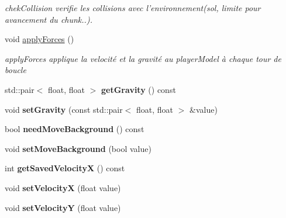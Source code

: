 \begin{DoxyCompactItemize}
\begin{DoxyCompactList}\small\item\em chek\+Collision verifie les collisions avec l'environnement(sol, limite pour avancement du chunk..). \end{DoxyCompactList}\item 
\hypertarget{class_player_model_ae3aa552eaddf24f71e0ee34571809d8b}{void \hyperlink{class_player_model_ae3aa552eaddf24f71e0ee34571809d8b}{apply\+Forces} ()}\label{class_player_model_ae3aa552eaddf24f71e0ee34571809d8b}

\begin{DoxyCompactList}\small\item\em apply\+Forces applique la velocité et la gravité au player\+Model à chaque tour de boucle \end{DoxyCompactList}\item 
\hypertarget{class_player_model_a71102e396908deafad7b12f49723d988}{std\+::pair$<$ float, float $>$ {\bfseries get\+Gravity} () const }\label{class_player_model_a71102e396908deafad7b12f49723d988}

\item 
\hypertarget{class_player_model_a01ae6ec96c356f1570f819aba2e44395}{void {\bfseries set\+Gravity} (const std\+::pair$<$ float, float $>$ \&value)}\label{class_player_model_a01ae6ec96c356f1570f819aba2e44395}

\item 
\hypertarget{class_player_model_a520ad09f7fed3938e569c5407bf40b98}{bool {\bfseries need\+Move\+Background} () const }\label{class_player_model_a520ad09f7fed3938e569c5407bf40b98}

\item 
\hypertarget{class_player_model_a89e0a3515e816c504b5ebc9d6987275c}{void {\bfseries set\+Move\+Background} (bool value)}\label{class_player_model_a89e0a3515e816c504b5ebc9d6987275c}

\item 
\hypertarget{class_player_model_a32a8d0c9b0cd8d5331c7e8b9b33fe018}{int {\bfseries get\+Saved\+Velocity\+X} () const }\label{class_player_model_a32a8d0c9b0cd8d5331c7e8b9b33fe018}

\item 
\hypertarget{class_player_model_a753f27d349d9aad8377006c0b985dd87}{void {\bfseries set\+Velocity\+X} (float value)}\label{class_player_model_a753f27d349d9aad8377006c0b985dd87}

\item 
\hypertarget{class_player_model_a02150563ba3ea615f70ccad6eb0197f8}{void {\bfseries set\+Velocity\+Y} (float value)}\label{class_player_model_a02150563ba3ea615f70ccad6eb0197f8}


\end{DoxyCompactItemize}
